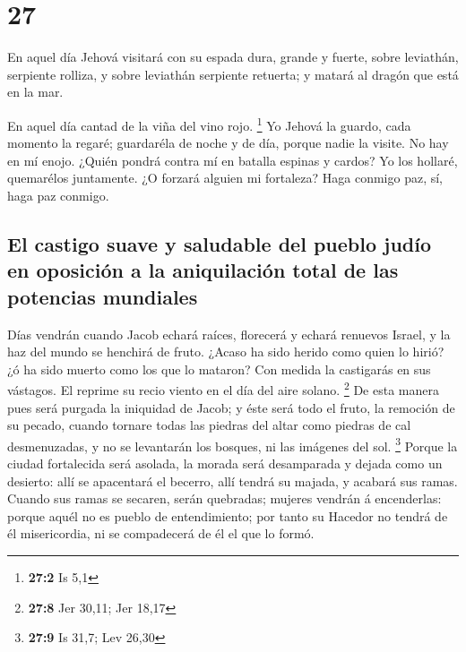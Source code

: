 \hypertarget{section-26}{%
\section{27}\label{section-26}}

 En aquel día Jehová visitará con su espada dura, grande y
fuerte, sobre leviathán, serpiente rolliza, y sobre leviathán serpiente
retuerta; y matará al dragón que está en la mar.

 En aquel día cantad de la viña del vino rojo. \footnote{\textbf{27:2}
  Is 5,1}  Yo Jehová la guardo, cada momento la regaré;
guardaréla de noche y de día, porque nadie la visite.  No
hay en mí enojo. ¿Quién pondrá contra mí en batalla espinas y cardos? Yo
los hollaré, quemarélos juntamente.  ¿O forzará alguien mi
fortaleza? Haga conmigo paz, sí, haga paz conmigo.

\hypertarget{el-castigo-suave-y-saludable-del-pueblo-juduxedo-en-oposiciuxf3n-a-la-aniquilaciuxf3n-total-de-las-potencias-mundiales}{%
\subsection{El castigo suave y saludable del pueblo judío en oposición a
la aniquilación total de las potencias
mundiales}\label{el-castigo-suave-y-saludable-del-pueblo-juduxedo-en-oposiciuxf3n-a-la-aniquilaciuxf3n-total-de-las-potencias-mundiales}}

 Días vendrán cuando Jacob echará raíces, florecerá y
echará renuevos Israel, y la haz del mundo se henchirá de fruto.
 ¿Acaso ha sido herido como quien lo hirió? ¿ó ha sido
muerto como los que lo mataron?  Con medida la castigarás
en sus vástagos. El reprime su recio viento en el día del aire solano.
\footnote{\textbf{27:8} Jer 30,11; Jer 18,17}  De esta
manera pues será purgada la iniquidad de Jacob; y éste será todo el
fruto, la remoción de su pecado, cuando tornare todas las piedras del
altar como piedras de cal desmenuzadas, y no se levantarán los bosques,
ni las imágenes del sol. \footnote{\textbf{27:9} Is 31,7; Lev 26,30}
 Porque la ciudad fortalecida será asolada, la morada
será desamparada y dejada como un desierto: allí se apacentará el
becerro, allí tendrá su majada, y acabará sus ramas. 
Cuando sus ramas se secaren, serán quebradas; mujeres vendrán á
encenderlas: porque aquél no es pueblo de entendimiento; por tanto su
Hacedor no tendrá de él misericordia, ni se compadecerá de él el que lo
formó.

